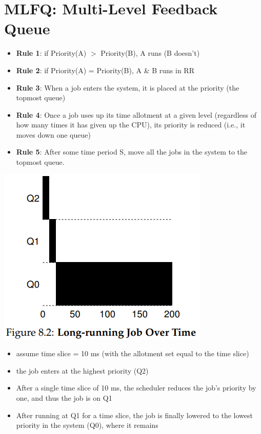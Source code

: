 \section*{MLFQ: Multi-Level Feedback Queue}
\begin{itemize}
\item \textbf{Rule 1}: if Priority(A) $>$ Priority(B), A runs (B doesn't)
\item \textbf{Rule 2}: if Priority(A) = Priority(B), A \& B runs in RR
\item \textbf{Rule 3}: When a job enters the system, it is placed at the  priority (the topmost queue)
\item \textbf{Rule 4}: Once a job uses up its time allotment at a given level (regardless of how many times it has given up the CPU), its priority is reduced (i.e., it moves down one queue)
\item \textbf{Rule 5}: After some time period S, move all the jobs in the system to the topmost queue.
\end{itemize}
\begin{minipage}{.4\linewidth}
\includegraphics[width=\linewidth]{imgs/sched_longr}
\end{minipage}
\begin{minipage}{.6\linewidth}
  \flushleft
  \begin{itemize}
  \item assume time slice = 10 ms (with the allotment set equal to the time slice)
  \item the job enters at the highest priority (Q2)
  \item  After a single time slice of 10 ms, the scheduler reduces the job's priority by one, and thus the job is on Q1
  \item After running at Q1 for a time slice, the job is finally lowered to the lowest priority in the system (Q0), where it remains
  \end{itemize}
\end{minipage}
